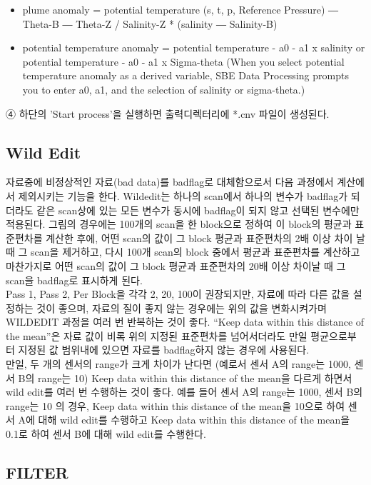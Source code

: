 \documentclass[
]{book}
\begin{document}
\begin{itemize}
\item
  plume anomaly = potential temperature (s, t, p, Reference Pressure) ― Theta-B ― Theta-Z / Salinity-Z * (salinity ― Salinity-B)
\item
  potential temperature anomaly = potential temperature - a0 - a1 x salinity or potential temperature - a0 - a1 x Sigma-theta (When you select potential temperature anomaly as a derived variable, SBE Data Processing prompts you to enter a0, a1, and the selection of salinity or sigma-theta.)
\end{itemize}

④ 하단의 'Start process'을 실행하면 출력디렉터리에 *.cnv 파일이 생성된다.

\hypertarget{wild-edit}{%
\subsection{Wild Edit}\label{wild-edit}}

자료중에 비정상적인 자료(bad data)를 badflag로 대체함으로서 다음 과정에서 계산에서 제외시키는 기능을 한다. Wildedit는 하나의 scan에서 하나의 변수가 badflag가 되더라도 같은 scan상에 있는 모든 변수가 동시에 badflag이 되지 않고 선택된 변수에만 적용된다. 그림의 경우에는 100개의 scan을 한 block으로 정하여 이 block의 평균과 표준편차를 계산한 후에, 어떤 scan의 값이 그 block 평균과 표준편차의 2배 이상 차이 날 때 그 scan을 제거하고, 다시 100개 scan의 block 중에서 평균과 표준편차를 계산하고 마찬가지로 어떤 scan의 값이 그 block 평균과 표준편차의 20배 이상 차이날 때 그 scan을 badflag로 표시하게 된다.\\
Pass 1, Pass 2, Per Block을 각각 2, 20, 100이 권장되지만, 자료에 따라 다른 값을 설정하는 것이 좋으며, 자료의 질이 좋지 않는 경우에는 위의 값을 변화시켜가며 WILDEDIT 과정을 여러 번 반복하는 것이 좋다. ``Keep data within this distance of the mean''은 자료 값이 비록 위의 지정된 표준편차를 넘어서더라도 만일 평균으로부터 지정된 값 범위내에 있으면 자료를 badflag하지 않는 경우에 사용된다.\\
만일, 두 개의 센서의 range가 크게 차이가 난다면 (예로서 센서 A의 range는 1000, 센서 B의 range는 10) Keep data within this distance of the mean을 다르게 하면서 wild edit를 여러 번 수행하는 것이 좋다. 예를 들어 센서 A의 range는 1000, 센서 B의 range는 10 의 경우, Keep data within this distance of the mean을 10으로 하여 센서 A에 대해 wild edit를 수행하고 Keep data within this distance of the mean을 0.1로 하여 센서 B에 대해 wild edit를 수행한다.

\hypertarget{filter}{%
\subsection{FILTER}\label{filter}}
\end{document}
